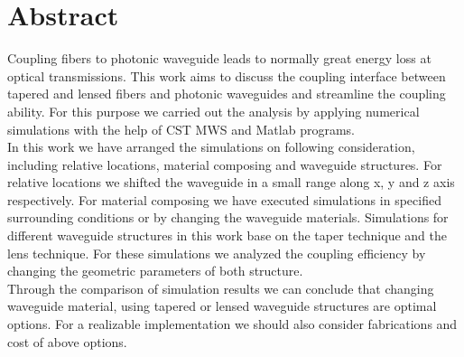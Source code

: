 \chapter*{Abstract}
\label{cha:kurzfassung}
Coupling fibers to photonic waveguide leads to normally great energy loss at optical transmissions. This work aims to discuss the coupling interface between tapered and lensed fibers and photonic waveguides and streamline the coupling ability. For this purpose we carried out the analysis by applying numerical simulations with the help of CST MWS and Matlab programs. \\

In this work we have arranged the simulations on following consideration, including relative locations, material composing and waveguide structures. For relative locations we shifted the waveguide in a small range along x, y and z axis respectively. For material composing we have executed simulations in specified surrounding conditions or by changing the waveguide materials.  Simulations for different waveguide structures in this work base on the taper technique and the lens technique. For these simulations we analyzed the coupling efficiency by changing the geometric parameters of both structure.\\

Through the comparison of simulation results we can conclude that changing waveguide material, using tapered or lensed waveguide structures are optimal options. For a realizable implementation we should also consider fabrications and cost of above options.
